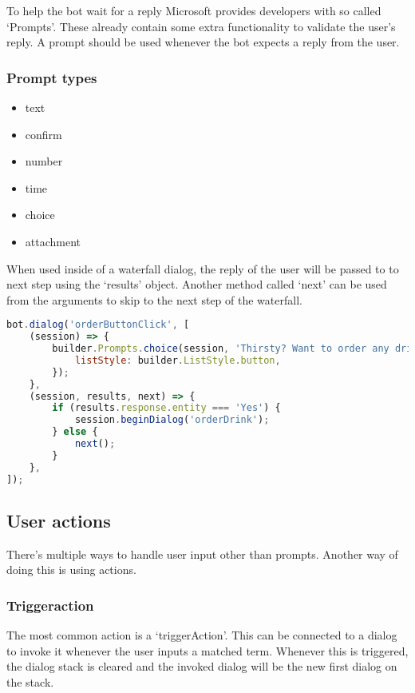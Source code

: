 To help the bot wait for a reply Microsoft provides developers with so called `Prompts'. These already contain some extra functionality to validate the user's reply. A prompt should be used whenever the bot expects a reply from the user.

\subsubsection{Prompt types}

\begin{itemize}
	\item text
	\item confirm
	\item number
	\item time
	\item choice
	\item attachment
\end{itemize}

When used inside of a waterfall dialog, the reply of the user will be passed to to next step using the `results' object. Another method called `next' can be used from the arguments to skip to the next step of the waterfall.

\begin{lstlisting}[language=JavaScript,caption=2-step waterfall using a prompt,label=listing:waterfall-and-prompt]
bot.dialog('orderButtonClick', [
	(session) => {
		builder.Prompts.choice(session, 'Thirsty? Want to order any drinks?', 'Yes|No drinks', {
			listStyle: builder.ListStyle.button,
		});
	},
	(session, results, next) => {
		if (results.response.entity === 'Yes') {
			session.beginDialog('orderDrink');
		} else {
			next();
		}
	},
]);
\end{lstlisting}

\subsection{User actions}

There's multiple ways to handle user input other than prompts. Another way of doing this is using actions.

\subsubsection{Triggeraction}

The most common action is a `triggerAction'. This can be connected to a dialog to invoke it whenever the user inputs a matched term. Whenever this is triggered, the dialog stack is cleared and the invoked dialog will be the new first dialog on the stack.

